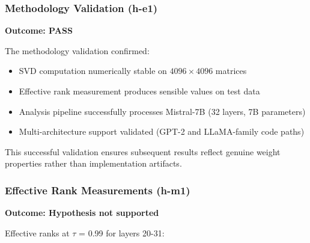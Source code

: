 
\subsubsection{Methodology Validation (h-e1)}

\textbf{Outcome: PASS}

The methodology validation confirmed:
\begin{itemize}
\item SVD computation numerically stable on $4096\times 4096$ matrices
\item Effective rank measurement produces sensible values on test data
\item Analysis pipeline successfully processes Mistral-7B (32 layers, 7B parameters)
\item Multi-architecture support validated (GPT-2 and LLaMA-family code paths)
\end{itemize}

This successful validation ensures subsequent results reflect genuine weight properties rather than implementation artifacts.

\subsubsection{Effective Rank Measurements (h-m1)}

\textbf{Outcome: Hypothesis not supported}

Effective ranks at $\tau$ = 0.99 for layers 20-31:

\begin{table}[htbp]
\centering
{}
\end{table}

